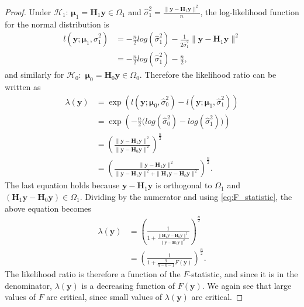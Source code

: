 \begin{proof}
    Under $\mathcal{H}_1$: $\boldsymbol{\mu}_1 = \textbf{H}_1 \textbf{y} \in \Omega_1$ and $\hat{\sigma}_1^2 = \frac{\| \textbf{y} - \textbf{H}_1 \textbf{y} \|^2}{n}$, the log-likelihood 
    function for the normal distribution is
    \begin{align*}
        l(\textbf{y};\boldsymbol{\mu}_1, \hat{\sigma}_1^2) &= -\frac{n}{2} log(\hat{\sigma}_1^2) - \frac{1}{2 \hat{\sigma}_1^2} \| \textbf{y} - \textbf{H}_1 \textbf{y} \|^2 \\
        &= -\frac{n}{2} log(\hat{\sigma}_1^2) - \frac{n}{2},
    \end{align*}
    and similarly for $\mathcal{H}_0:$ $\boldsymbol{\mu}_0 = \textbf{H}_0 \textbf{y} \in \Omega_0$. 
    Therefore the likelihood ratio can be written as
    \begin{align*}
        \lambda(\textbf{y}) &= \exp \left( l(\textbf{y};\boldsymbol{\mu}_0, \hat{\sigma}_0^2) - l(\textbf{y};\boldsymbol{\mu}_1, \hat{\sigma}_1^2) \right) \\
        &= \exp \left( -\frac{n}{2} \Big( log(\hat{\sigma}_0^2) - log(\hat{\sigma}_1^2)\Big) \right) \\
        &= \left( \frac{\| \textbf{y} - \textbf{H}_1 \textbf{y} \|^2}{\| \textbf{y} - \textbf{H}_0 \textbf{y} \|^2} \right)^{\frac{n}{2}} \\
        &= \left( \frac{\| \textbf{y} - \textbf{H}_1 \textbf{y} \|^2}{\| \textbf{y} - \textbf{H}_1 \textbf{y} \|^2 + \| \textbf{H}_1 \textbf{y} - \textbf{H}_0 \textbf{y} \|^2} \right)^{\frac{n}{2}}.
    \end{align*}
    The last equation holds because $\textbf{y} - \textbf{H}_1 \textbf{y}$ is orthogonal to $\Omega_1$ and $(\textbf{H}_1 \textbf{y} - \textbf{H}_0 \textbf{y}) \in \Omega_1$. 
    Dividing by the numerator and using \eqref{eq:F_statistic}, the above equation becomes
    \begin{align*}
        \lambda(\textbf{y}) &= \left( \frac{1}{1 + \frac{\| \textbf{H}_1 \textbf{y} - \textbf{H}_0 \textbf{y} \|^2}{\| \textbf{y} - \textbf{H}_1 \textbf{y} \|^2}} \right)^{\frac{n}{2}} \\
        &= \left( \frac{1}{1 + \frac{q}{n-k-1}F(\textbf{y})}  \right)^{\frac{n}{2}}.
    \end{align*}
    The likelihood ratio is therefore a function of the $F$-statistic, and since it is in the denominator, $\lambda(\textbf{y})$ is a decreasing function of $F(\textbf{y})$. We again see that large values of $F$ are critical, since small values of $\lambda(\textbf{y})$ are critical.
    

\end{proof}
